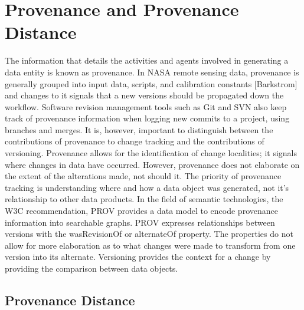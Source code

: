 \section{Provenance and Provenance Distance}

The information that details the activities and agents involved in generating a data entity is known as provenance.  In NASA remote sensing data, provenance is generally grouped into input data, scripts, and calibration constants [Barkstrom] and changes to it signals that a new versions should be propagated down the workflow.  Software revision management tools such as Git and SVN also keep track of provenance information when logging new commits to a project, using branches and merges.  It is, however, important to distinguish between the contributions of provenance to change tracking and the contributions of versioning.  Provenance allows for the identification of change localities; it signals where changes in data have occurred.  However, provenance does not elaborate on the extent of the alterations made, not should it.  The priority of provenance tracking is understanding where and how a data object was generated, not it's relationship to other data products.  In the field of semantic technologies, the W3C recommendation, PROV provides a data model to encode provenance information into searchable graphs.  PROV expresses relationships between versions with the wasRevisionOf or alternateOf property.  The properties do not allow for more elaboration as to what changes were made to transform from one version into its alternate.  Versioning provides the context for a change by providing the comparison between data objects.

\subsection{Provenance Distance}

